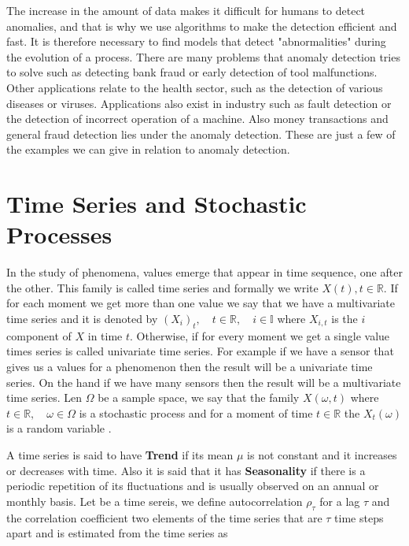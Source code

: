 \documentclass[a4paper,12pt]{report}
\theoremstyle{definitionNODot}
\begin{document}
	The increase in the amount of data makes it difficult for humans to detect anomalies, and that is why we use algorithms to make the detection efficient and fast. It is therefore necessary to find models that detect "abnormalities" during the evolution of a process. There are many problems that anomaly detection tries to solve such as detecting bank fraud or early detection of tool malfunctions. Other applications relate to the health sector, such as the detection of various diseases or viruses. Applications also exist in industry such as fault detection or the detection of incorrect operation of a machine. Also money transactions and general fraud detection lies under the anomaly detection. These are just a few of the examples we can give in relation to anomaly detection.
	
	\section{Time Series and Stochastic Processes}
	
	In the study of phenomena, values emerge that appear in time sequence, one after the other. This family is called time series and formally we write $ X(t), t\in \mathbb{R}$. If for each moment we get more than one value we say that we have a multivariate time series and it is denoted by $  (X_i)_t, \quad t\in \mathbb{R}, \quad i\in \mathbb{I} $ where $X_{i,t}$ is the $i$ component of $Χ$ in time $t$. Otherwise, if for every moment we get a single value times series is called univariate time series. For example if we have a sensor that gives us a values for a phenomenon then the result will be a univariate time series. On the hand if we have many sensors then the result will be a multivariate time series. Len $\Omega$ be a sample space, we say that the family $X(\omega,t) $ where $t\in\mathbb{R}, \quad \omega \in \Omega$ is a stochastic process and for a moment of time $t\in \mathbb{R} $ the $X_t( \omega )$ is a random variable \cite{wei2006time}.
	
	A time series is said to have \textbf{Trend} if its mean $\mu$ is not constant and it increases or decreases with time. Also it is said that it has \textbf{Seasonality} if there is a periodic repetition of its fluctuations and is usually observed on an annual or monthly basis. Let be a time sereis, we define autocorrelation $\rho_\tau$ for a lag $\tau$ and the correlation coefficient two
	elements of the time series that are $\tau$ time steps apart and is estimated from the time series as
	
\end{document}
